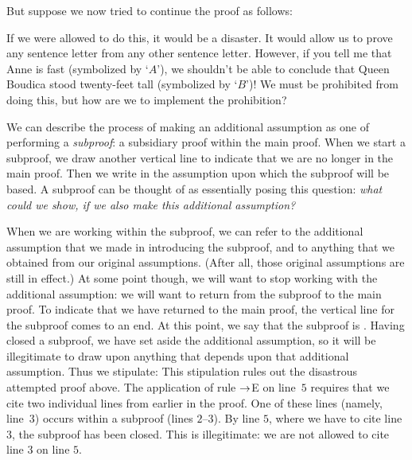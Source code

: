 But suppose we now tried to continue the proof as follows:
\begin{fitchproof}
	\open
		 
	\close
	 
	 
\end{fitchproof}
If we were allowed to do this, it would be a disaster. It would allow us to prove any sentence letter from any other sentence letter. However, if you tell me that Anne is fast (symbolized by `$A$'), we shouldn't be able to conclude that Queen Boudica stood twenty-feet tall (symbolized by `$B$')! We must be prohibited from doing this, but how are we to implement the prohibition?

We can describe the process of making an additional assumption as one of performing a \emph{subproof}: a subsidiary proof within the main proof. When we start a subproof, we draw another vertical line to indicate that we are no longer in the main proof. Then we write in the assumption upon which the subproof will be based. A subproof can be thought of as essentially posing this question: \emph{what could we show, if we also make this additional assumption?}

When we are working within the subproof, we can refer to the additional assumption that we made in introducing the subproof, and to anything that we obtained from our original assumptions. (After all, those original assumptions are still in effect.) At some point though, we will want to stop working with the additional assumption: we will want to return from the subproof to the main proof. To indicate that we have returned to the main proof, the vertical line for the subproof comes to an end. At this point, we say that the subproof is . Having closed a subproof, we have set aside the additional assumption, so it will be illegitimate to draw upon anything that depends upon that additional assumption. Thus we stipulate:
This stipulation rules out the disastrous attempted proof above. The application of rule $\rightarrow$E on line~$5$ requires that we cite two individual lines from earlier in the proof. One of these lines (namely, line~$3$) occurs within a subproof (lines $2$--$3$). By line $5$, where we have to cite line $3$, the subproof has been closed. This is illegitimate: we are not allowed to cite line $3$ on line $5$.

